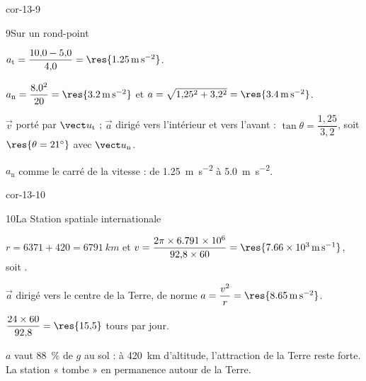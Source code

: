 \begin{blocLivre}{cor-13-9}
\begin{corrige}{9}{Sur un rond-point}
\begin{questions}
\item $a_\mathrm{t}=\dfrac{10{,}0-5{,}0}{4{,}0}=\res{\qty{1,25}{m.s^{-2}}}$.
\item $a_\mathrm{n}=\dfrac{8{,}0^2}{20}=\res{\qty{3,2}{m.s^{-2}}}$ et $a=\sqrt{1{,}25^2+3{,}2^2}=\res{\qty{3,4}{m.s^{-2}}}$.
\item $\vec{v}$ porté par $\ut$ ; $\vec{a}$ dirigé vers l'intérieur et vers l'avant : $\tan\theta=\dfrac{1{,}25}{3{,}2}$,
soit $\res{\theta=21^\circ}$ avec $\un$.
\item $a_\mathrm{n}$  comme le carré de la vitesse : de \qty{1,25}{m.s^{-2}} à
\qty{5,0}{m.s^{-2}}.
\end{questions}
\end{corrige}
\end{blocLivre}
\begin{blocLivre}{cor-13-10}
\begin{corrige}{10}{La Station spatiale internationale}
\begin{questions}
\item $r=6371+420=\qty{6791}{km}$ et $v=\dfrac{2\pi\times\num{6.791e6}}{92{,}8\times60}=\res{\qty{7,66e3}{m.s^{-1}}}$, soit
.
\item $\vec{a}$ dirigé vers le centre de la Terre, de norme $a=\dfrac{v^2}{r}=\res{\qty{8,65}{m.s^{-2}}}$.
\item $\dfrac{24\times60}{92{,}8}=\res{15{,}5}$ tours par jour.
\item $a$ vaut 88~\% de $g$ au sol : à 420~km d'altitude, l'attraction de la Terre reste forte. La station « tombe »
en permanence autour de la Terre.
\end{questions}
\end{corrige}
\end{blocLivre}
